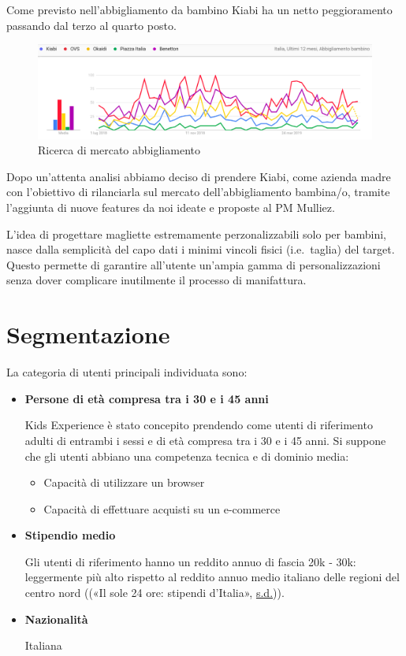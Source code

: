 \documentclass[12pt,italian,]{report}
\providecommand{\tightlist}{%
  \setlength{\itemsep}{0pt}\setlength{\parskip}{0pt}}
\begin{document}
Come previsto nell'abbigliamento da bambino Kiabi ha un netto
peggioramento passando dal terzo al quarto posto.

\begin{figure}[h]
\centering
\includegraphics{img/abbigliamento_bambino.png}
\caption{Ricerca di mercato abbigliamento}
\end{figure}

Dopo un'attenta analisi abbiamo deciso di prendere Kiabi, come azienda
madre con l'obiettivo di rilanciarla sul mercato dell'abbigliamento
bambina/o, tramite l'aggiunta di nuove features da noi ideate e proposte
al PM Mulliez.

L'idea di progettare magliette estremamente perzonalizzabili solo per
bambini, nasce dalla semplicità del capo dati i minimi vincoli fisici
(i.e.~taglia) del target. Questo permette di garantire all'utente
un'ampia gamma di personalizzazioni senza dover complicare inutilmente
il processo di manifattura.

\hypertarget{segmentazione}{%
\section{Segmentazione}\label{segmentazione}}

La categoria di utenti principali individuata sono:

\begin{itemize}
\item
  \textbf{Persone di età compresa tra i 30 e i 45 anni}

  Kids Experience è stato concepito prendendo come utenti di riferimento
  adulti di entrambi i sessi e di età compresa tra i 30 e i 45 anni. Si
  suppone che gli utenti abbiano una competenza tecnica e di dominio
  media:

  \begin{itemize}
  \tightlist
  \item
    Capacità di utilizzare un browser
  \item
    Capacità di effettuare acquisti su un e-commerce
  \end{itemize}
\item
  \textbf{Stipendio medio}

  Gli utenti di riferimento hanno un reddito annuo di fascia 20k - 30k:
  leggermente più alto rispetto al reddito annuo medio italiano delle
  regioni del centro nord ((«Il sole 24 ore: stipendi d'Italia»,
  \protect\hyperlink{ref-redditomedio}{s.d.})).
\item
  \textbf{Nazionalità}

  Italiana
\end{itemize}
\end{document}
